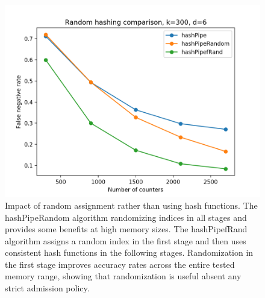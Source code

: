 \begin{figure}[t]
  \centering
    \includegraphics[scale=0.5]{interview}
     \caption{Impact of random assignment rather than using hash functions. The hashPipeRandom algorithm randomizing indices in all stages and provides some benefits at high memory sizes. The hashPipefRand algorithm assigns a random index in the first stage and then uses consistent hash functions in the following stages. Randomization in the first stage improves accuracy rates across the entire tested memory range, showing that randomization is useful absent any strict admission policy.}
\end{figure}

